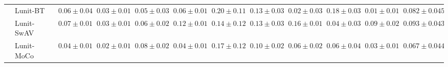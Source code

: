 \begin{tabular}{ll|cccc|c|cccc|c}
 & Lunit-BT~\cite{kang2023benchmarking} & $0.06 \pm 0.04$ & $0.03 \pm 0.01$ & $0.05 \pm 0.03$ & $0.06 \pm 0.01$ & $0.20 \pm 0.11$ & $0.13 \pm 0.03$ & $0.02 \pm 0.03$ & $0.18 \pm 0.03$ & $\mathbf{0.01 \pm 0.01}$ & $0.082 \pm 0.045$ \\
 & Lunit-SwAV~\cite{kang2023benchmarking} & $0.07 \pm 0.01$ & $0.03 \pm 0.01$ & $0.06 \pm 0.02$ & $0.12 \pm 0.01$ & $0.14 \pm 0.12$ & $0.13 \pm 0.03$ & $0.16 \pm 0.01$ & $0.04 \pm 0.03$ & $0.09 \pm 0.02$ & $0.093 \pm 0.043$ \\
 & Lunit-MoCo~\cite{kang2023benchmarking} & $0.04 \pm 0.01$ & $0.02 \pm 0.01$ & $0.08 \pm 0.02$ & $0.04 \pm 0.01$ & $0.17 \pm 0.12$ & $0.10 \pm 0.02$ & $0.06 \pm 0.02$ & $0.06 \pm 0.04$ & $0.03 \pm 0.01$ & $0.067 \pm 0.044$ \\
\cline{1-12}
\bottomrule
\end{tabular}
